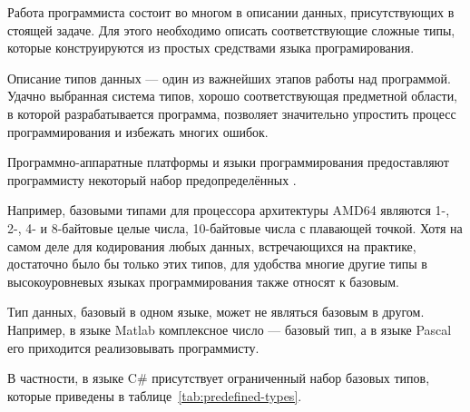 Работа программиста состоит во многом в описании данных,
присутствующих в стоящей задаче. Для этого необходимо описать
соответствующие сложные типы, которые конструируются из простых
средствами языка програмирования.

Описание типов данных — один из важнейших этапов работы над
программой. Удачно выбранная система типов, хорошо соответствующая
предметной области, в которой разрабатывается программа, позволяет
значительно упростить процесс программирования и избежать многих
ошибок.


Программно-аппаратные платформы и языки программирования предоставляют
программисту некоторый набор предопределённых .

Например, базовыми типами для процессора архитектуры AMD64 являются
1-, 2-, 4- и 8-байтовые целые числа, 10-байтовые числа с плавающей
точкой. Хотя на самом деле для кодирования любых данных, встречающихся
на практике, достаточно было бы только этих типов, для удобства многие
другие типы в высокоуровневых языках программирования также относят к
базовым.

Тип данных, базовый в одном языке, может не являться базовым в
другом. Например, в языке Matlab комплексное число — базовый тип, а в
языке Pascal его приходится реализовывать программисту.

В частности, в языке C\# присутствует ограниченный набор базовых
типов, которые приведены в таблице~\ref{tab:predefined-types}.

